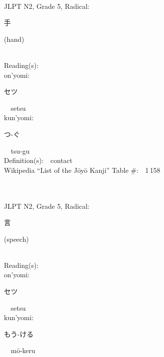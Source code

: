 \begin{multicols}{2}
{\fontsize{34pt}{40pt}  }\ \ \\  %
{JLPT N2, Grade 5, Radical:\ \ {\begin{CJK}{UTF8}{min} 手 \end{CJK}} (hand) } \\
Reading(s):\ \ \\
{\hspace*{1em}}on'yomi:\ \ \\
{\hspace*{2em}}{\begin{CJK}{UTF8}{min} セツ \end{CJK}}\ \ setsu\ \ \\
{\hspace*{1em}}kun'yomi:\ \ \\
{\hspace*{2em}}{\begin{CJK}{UTF8}{min} つ-ぐ \end{CJK}}\ \ tsu-gu\ \ \\
Definition(s):\ \ contact \\
Wikipedia ``List of the J\=oy\=o Kanji'' Table \#:\ \ 1\,158 \\
\ \ \\
{\fontsize{34pt}{40pt}  }\ \ \\  %
{JLPT N2, Grade 5, Radical:\ \ {\begin{CJK}{UTF8}{min} 言 \end{CJK}} (speech) } \\
Reading(s):\ \ \\
{\hspace*{1em}}on'yomi:\ \ \\
{\hspace*{2em}}{\begin{CJK}{UTF8}{min} セツ \end{CJK}}\ \ setsu\ \ \\
{\hspace*{1em}}kun'yomi:\ \ \\
{\hspace*{2em}}{\begin{CJK}{UTF8}{min} もう-ける \end{CJK}}\ \ m\=o-keru\ \ \\

\end{multicols}
